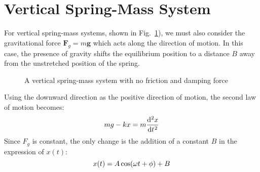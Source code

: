 \section{Vertical Spring-Mass System}

For vertical spring-mass systems, shown in
Fig.~\ref{fig:vertical-spring-mass}), we must also consider the gravitational
force $\bm F_g=m\bm g$ which acts along the direction of motion. In this case,
the presence of gravity shifts the equilibrium position to a distance $B$ away
from the unstretched position of the spring.
\begin{figure}[ht]
  \centering
  \caption{A vertical spring-mass system with no friction and damping force}
  \label{fig:vertical-spring-mass}
\end{figure}
Using the downward direction as the
positive direction of motion, the second law of motion becomes:
\begin{equation}
  mg-kx=m\diff[2]xt
\end{equation}
Since $F_g$ is constant, the only change is the addition of a constant $B$
in the expression of $x(t)$:
\begin{equation}
  x(t) = A\cos(\omega t+\phi) + B\\
  \label{eq:ode1a}
\end{equation}
